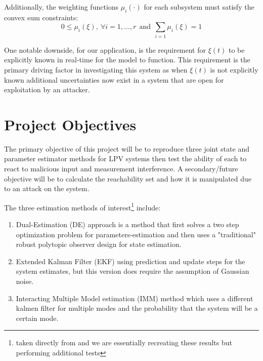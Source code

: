 \documentclass[]{article}
\begin{document}
Additionally, the weighting functions $\mu_i (\cdot)$ for each subsystem must satisfy the convex sum constraints:
\begin{equation}\label{eq:convex_sum_constraints}
	0 \leq \mu_i(\xi), \ \forall i = 1,\dots,r \ \ \text{and} \ \ \sum_{i=1} \mu_i(\xi) = 1
\end{equation}


One notable downside, for our application, is the requirement for $\xi(t)$ to be explicitly known in real-time for the model to function. This requirement is the primary driving factor in investigating this system as when $\xi(t)$ is not explicitly known additional uncertainties now exist in a system that are open for exploitation by an attacker.

\section{Project Objectives}
The primary objective of this project will be to reproduce three joint state and parameter estimator methods for LPV systems then test the ability of each to react to malicious input and measurement interference. A secondary/future objective will be to calculate the reachability set and how it is manipulated due to an attack on the system.

The three estimation methods of interest\footnote{taken directly from \cite{beelen2017joint} and we are essentially recreating these results but performing additional tests} include:
\begin{enumerate}
	\item Dual-Estimation (DE) approach is a method that first solves a two step optimization problem for parameters-estimation and then uses a "traditional" robust polytopic observer design for state estimation. \cite{beelen2017joint}
	\item Extended Kalman Filter (EKF) using prediction and update steps for the system estimates, but this version does require the assumption of Gaussian noise. \cite{beelen2017joint}
	\item Interacting Multiple Model estimation (IMM) method which uses a different kalmen filter for multiple modes and the probability that the system will be a certain mode.\cite{bar2004estimation}
\end{enumerate}
\end{document}
